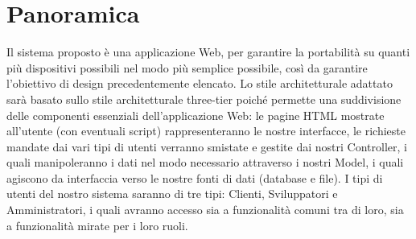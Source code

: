 \section{Panoramica}
Il sistema proposto è una applicazione Web, per garantire la portabilità su quanti più dispositivi possibili nel modo più semplice possibile, così da garantire l’obiettivo di design precedentemente elencato. Lo stile architetturale adattato sarà basato sullo stile architetturale three-tier poiché permette una suddivisione delle componenti essenziali dell’applicazione Web: le pagine HTML mostrate all’utente (con eventuali script) rappresenteranno le nostre interfacce, le richieste mandate dai vari tipi di utenti verranno smistate e gestite dai nostri Controller, i quali manipoleranno i dati nel modo necessario attraverso i nostri Model, i quali agiscono da interfaccia verso le nostre fonti di dati (database e file). I tipi di utenti del nostro sistema saranno di tre tipi: Clienti, Sviluppatori e Amministratori, i quali avranno accesso sia a funzionalità comuni tra di loro, sia a funzionalità mirate per i loro ruoli.

